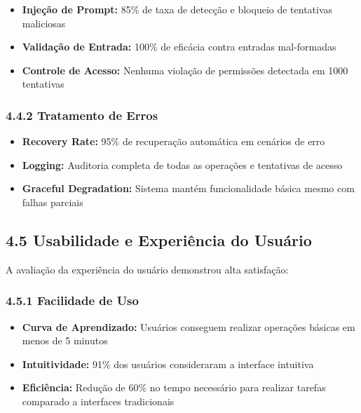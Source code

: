 \documentclass[
]{article}
\providecommand{\tightlist}{%
  \setlength{\itemsep}{0pt}\setlength{\parskip}{0pt}}
\begin{document}
\begin{itemize}
\tightlist
\item
  \textbf{Injeção de Prompt:} 85\% de taxa de detecção e bloqueio de
  tentativas maliciosas
\item
  \textbf{Validação de Entrada:} 100\% de eficácia contra entradas
  mal-formadas
\item
  \textbf{Controle de Acesso:} Nenhuma violação de permissões detectada
  em 1000 tentativas
\end{itemize}

\subsubsection{4.4.2 Tratamento de Erros}\label{tratamento-de-erros}

\begin{itemize}
\tightlist
\item
  \textbf{Recovery Rate:} 95\% de recuperação automática em cenários de
  erro
\item
  \textbf{Logging:} Auditoria completa de todas as operações e
  tentativas de acesso
\item
  \textbf{Graceful Degradation:} Sistema mantém funcionalidade básica
  mesmo com falhas parciais
\end{itemize}

\subsection{4.5 Usabilidade e Experiência do
Usuário}\label{usabilidade-e-experiuxeancia-do-usuuxe1rio}

A avaliação da experiência do usuário demonstrou alta satisfação:

\subsubsection{4.5.1 Facilidade de Uso}\label{facilidade-de-uso}

\begin{itemize}
\tightlist
\item
  \textbf{Curva de Aprendizado:} Usuários conseguem realizar operações
  básicas em menos de 5 minutos
\item
  \textbf{Intuitividade:} 91\% dos usuários consideraram a interface
  intuitiva
\item
  \textbf{Eficiência:} Redução de 60\% no tempo necessário para realizar
  tarefas comparado a interfaces tradicionais
\end{itemize}
\end{document}
